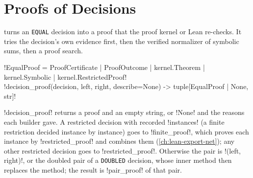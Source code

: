 \section{Proofs of Decisions}\label{sec:proofs-decision-proof}

 turns an \texttt{EQUAL} decision into a proof that the proof kernel or Lean re-checks. It tries the decision's own evidence first, then the verified normalizer of symbolic sums, then a proof search.

\begin{signature}
\py!EqualProof = ProofCertificate | ProofOutcome | kernel.Theorem | kernel.Symbolic | kernel.RestrictedProof!\\
\py!decision_proof(decision, left, right, describe=None) -> tuple[EqualProof | None, str]!
\end{signature}

\py!decision_proof! returns a proof and an empty string, or \py!None! and the reasons each builder gave. A restricted decision with recorded \py!instances! (a finite restriction decided instance by instance) goes to \py!finite_proof!, which proves each instance by \py!restricted_proof! and combines them (\cref{ch:lean-export-net}); any other restricted decision goes to \py!restricted_proof!. Otherwise the pair is \py!(left, right)!, or the doubled pair of a \texttt{DOUBLED} decision, whose inner method then replaces the method; the result is \py!pair_proof! of that pair.

